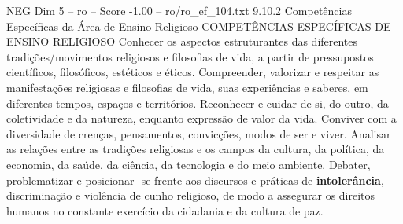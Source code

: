 \begin{textsample}{NEG Dim 5 – ro – Score -1.00 – ro/ro\_ef\_104.txt}  \label{ex:f5_neg_178}
9.10.2 Competências Específicas da Área de Ensino Religioso COMPETÊNCIAS ESPECÍFICAS DE ENSINO RELIGIOSO Conhecer os aspectos estruturantes das diferentes tradições/movimentos religiosos e filosofias de vida, a partir de pressupostos científicos, filosóficos, estéticos e éticos.
Compreender, valorizar e respeitar as manifestações religiosas e filosofias de vida, suas experiências e saberes, em diferentes tempos, espaços e territórios.
Reconhecer e cuidar de si, do outro, da coletividade e da natureza, enquanto expressão de valor da vida.
Conviver com a diversidade de crenças, pensamentos, convicções, modos de ser e viver.
Analisar as relações entre as tradições religiosas e os campos da cultura, da política, da economia, da saúde, da ciência, da tecnologia e do meio ambiente.
Debater, problematizar e posicionar -se frente aos discursos e práticas de \textbf{intolerância}, discriminação e violência de cunho religioso, de modo a assegurar os direitos humanos no constante exercício da cidadania e da cultura de paz.

\end{textsample}

